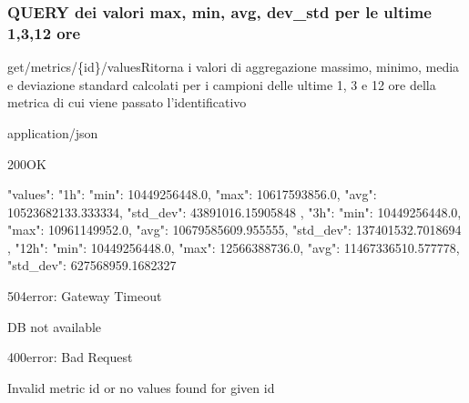 \subsubsection{QUERY dei valori max, min, avg, dev\_std per le ultime 1,3,12 ore}
    \begin{apiRoute}{get}{/metrics/\{id\}/values}{Ritorna i valori di aggregazione massimo, minimo, media e deviazione standard calcolati per i campioni delle ultime 1, 3 e 12 ore della metrica di cui viene passato l'identificativo}
    	
    	\begin{routeParameter}
    	\end{routeParameter}
    	\begin{routeResponse}{application/json}
    		\begin{routeResponseItem}{200}{OK}
    			\begin{routeResponseItemBody}
{
    "values": {
        "1h": {
            "min": 10449256448.0,
            "max": 10617593856.0,
            "avg": 10523682133.333334,
            "std_dev": 43891016.15905848
        },
        "3h": {
            "min": 10449256448.0,
            "max": 10961149952.0,
            "avg": 10679585609.955555,
            "std_dev": 137401532.7018694
        },
        "12h": {
            "min": 10449256448.0,
            "max": 12566388736.0,
            "avg": 11467336510.577778,
            "std_dev": 627568959.1682327
        }
    }
}
    			\end{routeResponseItemBody}
    		\end{routeResponseItem}
                \begin{routeResponseItem}{504}{error: Gateway Timeout}
    			\begin{routeResponseItemBody}
DB not available
    			\end{routeResponseItemBody}
    		\end{routeResponseItem}
    		\begin{routeResponseItem}{400}{error: Bad Request}
    			\begin{routeResponseItemBody}
Invalid metric id or no values found for given id
    			\end{routeResponseItemBody}
    		\end{routeResponseItem}
    	\end{routeResponse}
    	
    \end{apiRoute}
\newpage
